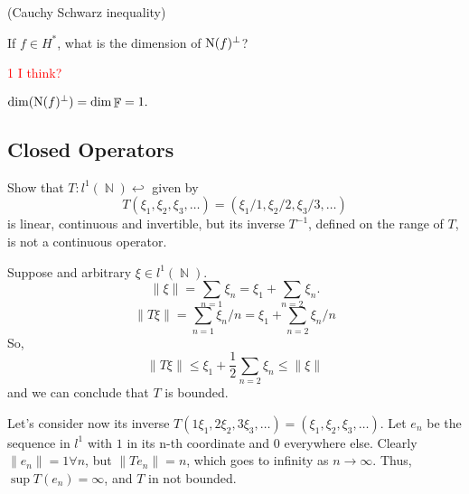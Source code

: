 \documentclass{article}
\theoremstyle{exercisestyle}
\newenvironment{exercise}[1]
  {\renewcommand\theinnerex{#1}\innerex}
  {\endinnerex}
\DeclareMathOperator{\Natural}{\mathbb{N}}
\DeclareMathOperator{\field}{\mathbb{F}}
\newcommand{\norm}[1]{\lVert #1 \rVert}
\begin{document}
\begin{exercise}{1.1.39} (Cauchy Schwarz inequality)

\end{exercise}

\begin{exercise}{1.1.42}
    If $f \in H^*$, what is the dimension of $\operatorname{N}(f)^\perp$?

    \textcolor{red}{1 I think?}

    $\dim (\kernel(f)^\perp )= \dim \field = 1.$

\end{exercise}

\subsection{Closed Operators}


\begin{exercise}{1.2.3}
    Show that $T : l^1 (\Natural) \hookleftarrow$ given by $$T (\xi_1, \xi_2, \xi_3, \dots ) = (\xi_1 /1, \xi_2 /2,\xi_3 /3, \dots )$$
    is linear, continuous and invertible, but its inverse $T^{-1}$, defined on the
    range of $T$, is not a continuous operator.


    Suppose and arbitrary $\xi \in l^1(\Natural)$.
    $$\norm{\xi} = \sum_{n=1} \xi_n = \xi_1 + \sum_{n=2} \xi_n.$$
    $$ \norm{T\xi} = \sum_{n=1} \xi_n/n = \xi_1 + \sum_{n=2} \xi_n/n $$
    So,
    $$ \norm{T\xi} \leq \xi_1 + \frac{1}{2} \sum_{n=2} \xi_n \leq \norm{\xi}$$
    and we can conclude that $T$ is bounded.

    Let's consider now its inverse $ T(1\xi_1, 2\xi_2, 3\xi_3, \dots) = (\xi_1, \xi_2,\xi_3, \dots)$. Let $e_n$ be the sequence in $l^1$ with $1$ in its n-th coordinate and
    $0$ everywhere else. Clearly $\norm{e_n} = 1 \forall n$, but $\norm{Te_n} = n$, which goes to infinity as $n\to\infty$. Thus, $\sup T(e_n) = \infty$, and $T$ in not bounded.

\end{exercise}
\end{document}
